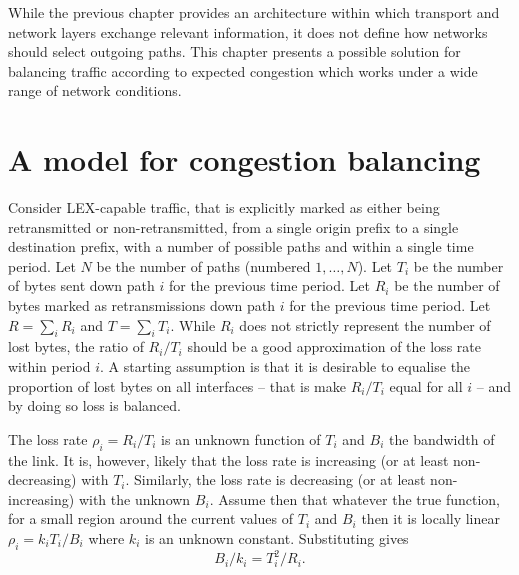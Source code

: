 While the previous chapter provides an architecture within which transport and network layers exchange relevant information, it does not define how networks should select outgoing paths. 
This chapter presents a possible solution for balancing traffic according to expected congestion which works under a wide range of network conditions.

\section{A model for congestion balancing}

Consider \ac{LEX}-capable traffic, that is explicitly marked as either being retransmitted or non-retransmitted, from a single origin prefix to a single destination prefix, with a number of possible paths and within a single time period.  
Let $N$ be the number of paths (numbered $1,\ldots,N$). 
Let $T_i$ be the number of bytes sent down path $i$ for the previous time period. 
Let $R_i$ be the number of bytes marked as retransmissions down path $i$ for the previous time period.  
Let $R=\sum_i R_i$ and $T=\sum_i T_i$.
While $R_i$ does not strictly represent the number of lost bytes, the ratio of $R_i/T_i$ should be a good approximation of the loss rate within period $i$.
A starting assumption is that it is desirable to equalise the proportion of lost bytes on all interfaces -- that is make $R_i/T_i$ equal for all $i$ -- and by doing so loss is balanced.

The loss rate $\rho_i = R_i/T_i$ is an unknown function of $T_i$ and $B_i$ the bandwidth of the link.  
It is, however, likely that the loss rate is increasing (or at least non-decreasing) with $T_i$.
Similarly, the loss rate is decreasing (or at least non-increasing) with the unknown $B_i$.
Assume then that whatever the true function, for a small region around the current values of $T_i$ and $B_i$ then it is locally linear $\rho_i = k_i T_i/B_i$ where $k_i$ is an unknown constant.
Substituting gives
\begin{equation}
B_i/k_i = T_i^2/R_i.
\label{eqn:bik}
\end{equation}


